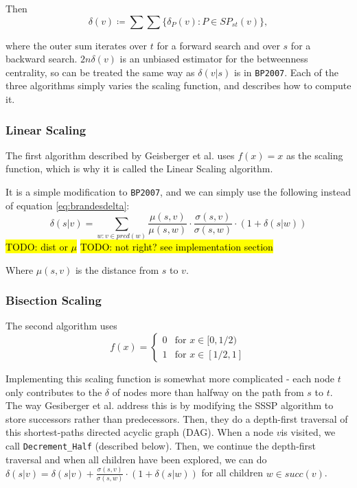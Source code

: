\documentclass[12pt,a4paper,twoside,openright]{report}
\newcommand{\todo}[1]{\hl{TODO: #1}}
\newcommand{\ttt}[1]{\texttt{#1}}
\begin{document}
	Then \begin{equation}
	\delta(v) \coloneqq \sum \sum \{\delta_P(v) \colon P \in SP_{st}(v) \},
	\end{equation}
		
	where the outer sum iterates over $t$ for a forward search and over $s$ for a backward search. $2n\delta(v)$ is an unbiased estimator for the betweenness centrality, so can be treated the same way as $\delta(v|s)$ is in \ttt{BP2007}. Each of the three algorithms simply varies the scaling function, and describes how to compute it.

	
	\subsubsection{Linear Scaling}
	The first algorithm described by Geisberger et al. uses $f(x) = x$ as the scaling function, which is why it is called the Linear Scaling algorithm.
	
	It is a simple modification to \ttt{BP2007}, and we can simply use the following instead of equation \ref{eq:brandesdelta}:
	\begin{equation} \label{eq:lineardelta}
		\delta(s|v) = \sum_{w: v \in pred(w)} \frac{\mu(s,v)}{\mu(s,w)} \cdot \frac{\sigma(s,v)}{\sigma(s,w)} \cdot (1+\delta(s|w))
	\end{equation} \todo{dist or $\mu$} \todo{not right? see implementation section}
	
	Where $\mu(s,v)$ is the distance from $s$ to $v$.
	
	\subsubsection{Bisection Scaling}
	The second algorithm uses \begin{equation}
		f(x) = \begin{cases}
			0 & \text{for } x \in [0,1/2)\\
			1 & \text{for } x \in [1/2,1]
		\end{cases}
	\end{equation}
	
	Implementing this scaling function is somewhat more complicated - each node $t$ only contributes to the $\delta$ of nodes more than halfway on the path from $s$ to $t$. The way Gesiberger et al. address this is by modifying the SSSP algorithm to store successors rather than predecessors. Then, they do a depth-first traversal of this shortest-paths directed acyclic graph (DAG). When a node $v$is visited, we call \ttt{Decrement\_Half} (described below). Then, we continue the depth-first traversal and when all children have been explored, we can do $\delta(s|v) = \delta(s|v) + \frac{\sigma(s,v)}{\sigma(s,w)} \cdot (1+\delta(s|w))$ for all children $w \in succ(v)$.
	
\end{document}
